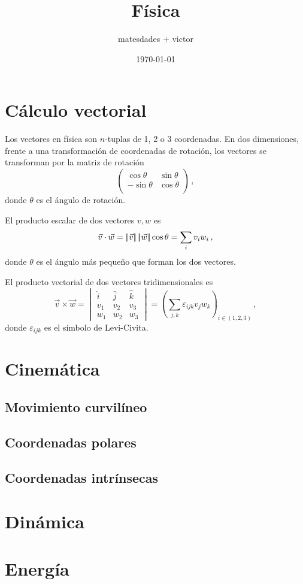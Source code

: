 \documentclass{article}
\title{Física}
\author{matesdades + victor}
\date{\today}
\newcommand{\norm}[1]%
{\ensuremath\left\vert{\!\!}\left\vert#1\right\vert{\!\!}\right\vert}
\begin{document}
\maketitle

\section{Cálculo vectorial}
Los vectores en física son $n$-tuplas de 1, 2 o 3 coordenadas. En dos 
dimensiones, frente a una transformación de coordenadas de rotación, los 
vectores se transforman por la matriz de rotación
\[
	\begin{pmatrix}
		\cos \theta & \sin \theta \\
		-\sin \theta & \cos \theta \\
	\end{pmatrix}\,,
\]
donde $\theta$ es el ángulo de rotación.

El producto escalar de dos vectores $v,w$ es
\[
	\vec{v}\cdot \vec{w} = \norm{\vec{v}}\norm{\vec{w}} \cos \theta = \sum_{i} 
	v_iw_i\,,
\]
donde $\theta$ es el ángulo más pequeño que forman los dos vectores.

El producto vectorial de dos vectores tridimensionales es
\[
	\vec{v}\times\vec{w} =
	\begin{vmatrix}
		\hat{i} & \hat{j} & \hat{k}\\
		v_1 & v_2 & v_3\\
		w_1 & w_2 & w_3
	\end{vmatrix}
	 = \left(\sum_{j,k}^{} \varepsilon_{ijk}v_jw_k\right)_{i\in(1,2,3)}\,,
\]
donde $\varepsilon_{ijk}$ es el símbolo de Levi-Civita.

\section{Cinemática}

\subsection{Movimiento curvilíneo}
\subsection{Coordenadas polares}
\subsection{Coordenadas intrínsecas}

\section{Dinámica}

\section{Energía}
\end{document}
